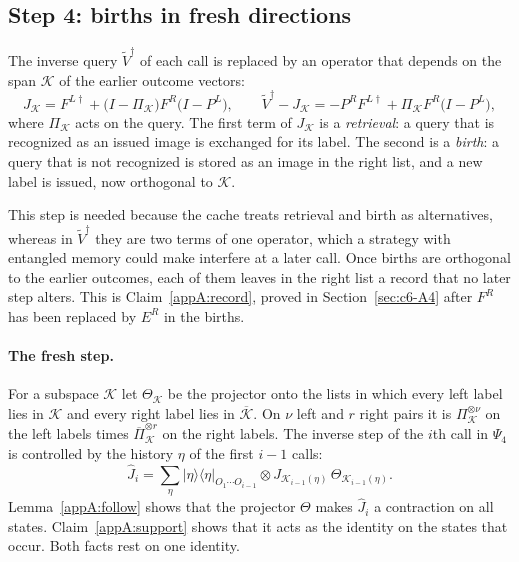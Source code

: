 \documentclass[11pt,letterpaper]{article}
\theoremstyle{definition}\newtheorem{definition}[theorem]{Definition}
\newcommand{\ket}[1]{\lvert#1\rangle}
\newcommand{\bra}[1]{\langle#1\rvert}
\newcommand{\proj}[1]{\ket{#1}\!\bra{#1}}
\begin{document}
\subsection{Step 4: births in fresh directions}\label{sec:c6-A3}

The inverse query $\widetilde V^\dagger$ of each call is replaced by an
operator that depends on the span $\mathcal K$ of the earlier outcome
vectors:
\begin{equation}\label{eq:c6-fresh-J}
 J_{\mathcal K}=F^{L\dagger}
   +\bigl(I-\Pi_{\mathcal K}\bigr)F^R\bigl(I-P^L\bigr),
 \qquad
 \widetilde V^\dagger-J_{\mathcal K}
 =-P^RF^{L\dagger}+\Pi_{\mathcal K}F^R\bigl(I-P^L\bigr),
\end{equation}
where $\Pi_{\mathcal K}$ acts on the query. The first term of
$J_{\mathcal K}$ is a \emph{retrieval}: a query that is recognized as
an issued image is exchanged for its label. The second is a
\emph{birth}: a query that is not recognized is stored as an image in
the right list, and a new label is issued, now orthogonal to
$\mathcal K$.

This step is needed because the cache treats retrieval and birth
as alternatives, whereas in $\widetilde V^\dagger$ they are two terms
of one operator, which a strategy with entangled memory could make
interfere at a later call. Once births are orthogonal to the earlier
outcomes, each of them leaves in the right list a record that no later
step alters. This is Claim~\ref{appA:record}, proved in
Section~\ref{sec:c6-A4} after $F^R$ has been replaced by $E^R$ in the
births.

\paragraph{The fresh step.}
For a subspace $\mathcal K$ let $\Theta_{\mathcal K}$ be the projector
onto the lists in which every left label lies in $\mathcal K$ and
every right label lies in $\overline{\mathcal K}$. On $\nu$ left and
$r$ right pairs it is $\Pi_{\mathcal K}^{\otimes\nu}$ on the left
labels times $\overline\Pi_{\mathcal K}^{\otimes r}$ on the right
labels. The
inverse step of the $i$th call in $\Psi_4$ is controlled by the
history $\eta$ of the first $i-1$ calls:
\begin{equation}\label{appA:fresh-step}
 \widehat J_i=\sum_{\eta}\proj\eta_{O_1\cdots O_{i-1}}\otimes
   J_{\mathcal K_{i-1}(\eta)}\,\Theta_{\mathcal K_{i-1}(\eta)} .
\end{equation}
Lemma~\ref{appA:follow} shows that the projector $\Theta$ makes
$\widehat J_i$ a contraction on all states. Claim~\ref{appA:support}
shows that it acts as the identity on the states that occur. Both
facts rest on one identity.
\end{document}
